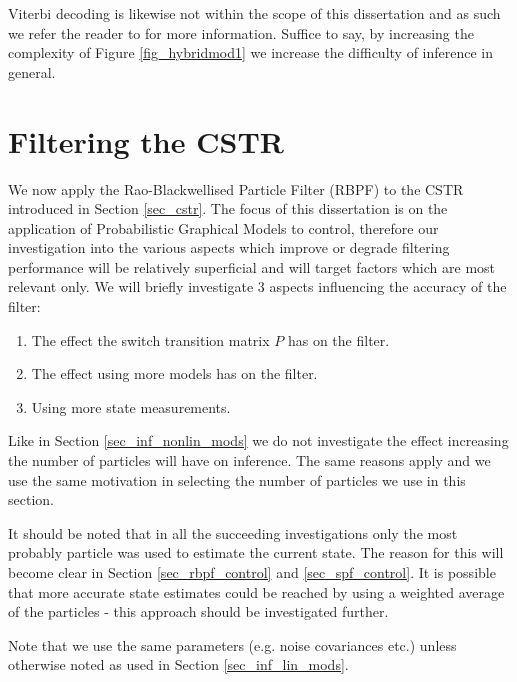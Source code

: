 Viterbi decoding is likewise not within the scope of this dissertation and as such we refer the reader to \cite{murphy1} for more information. Suffice to say, by increasing the complexity of Figure \ref{fig_hybridmod1} we increase the difficulty of inference in general.

\section{Filtering the CSTR}
\label{sec_rbpf_filtering_cstr}
We now apply the Rao-Blackwellised Particle Filter (RBPF) to the CSTR introduced in Section \ref{sec_cstr}. The focus of this dissertation is on the application of Probabilistic Graphical Models to control, therefore our investigation into the various aspects which improve or degrade filtering performance will be relatively superficial and will target factors which are most relevant only. We will briefly investigate 3 aspects influencing the accuracy of the filter:
\begin{enumerate}
\item
The effect the switch transition matrix $P$ has on the filter.
\item
The effect using more models has on the filter.
\item
Using more state measurements.
\end{enumerate}
Like in Section \ref{sec_inf_nonlin_mods} we do not investigate the effect increasing the number of particles will have on inference. The same reasons apply and we use the same motivation in selecting the number of particles we use in this section.

It should be noted that in all the succeeding investigations only the most probably particle was used to estimate the current state. The reason for this will become clear in Section \ref{sec_rbpf_control} and \ref{sec_spf_control}. It is possible that more accurate state estimates could be reached by using a weighted average of the particles - this approach should be investigated further.

Note that we use the same parameters (e.g. noise covariances etc.) unless otherwise noted as used in Section \ref{sec_inf_lin_mods}.

